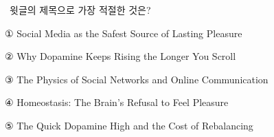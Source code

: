 \documentclass[11pt,a4paper]{article}
\newcommand{\qno}[1]{\par\vspace{8pt}\noindent{\sffamily\bfseries #1.}\ }
\newcommand{\instr}[1]{{\sffamily #1}\par\vspace{3pt}}
\begin{document}
\qno{4}\instr{윗글의 제목으로 가장 적절한 것은?}
\begin{choices}
\item ① Social Media as the Safest Source of Lasting Pleasure
\item ② Why Dopamine Keeps Rising the Longer You Scroll
\item ③ The Physics of Social Networks and Online Communication
\item ④ Homeostasis: The Brain's Refusal to Feel Pleasure
\item ⑤ The Quick Dopamine High and the Cost of Rebalancing
\end{choices}
\end{document}
